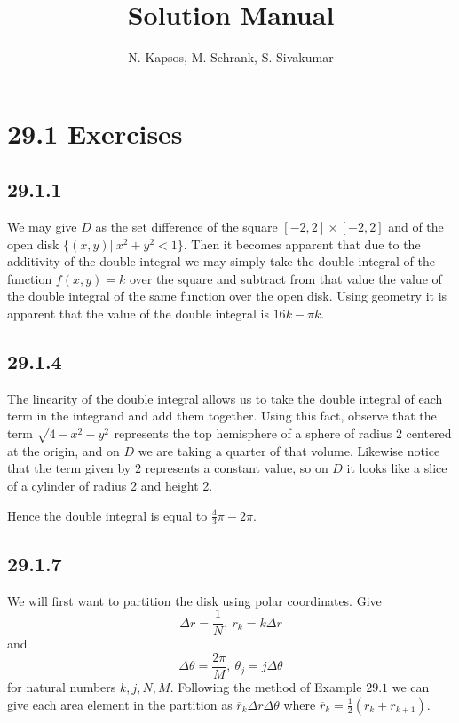 \documentclass{article}
\title{Solution Manual}
\author{N. Kapsos, M. Schrank, S. Sivakumar}
\date{}
\begin{document}
\maketitle
\setcounter{secnumdepth}{0}

\section{29.1 Exercises}

\subsection{29.1.1}

We may give $D$ as the set difference of the square $\left[-2,2\right]\times\left[-2,2\right]$ and of the open disk $\{(x,y)|~x^2+y^2<1\}$. Then it becomes apparent that due to the additivity of the double integral we may simply take the double integral of the function $f(x,y) = k$ over the square and subtract from that value the value of the double integral of the same function over the open disk. Using geometry it is apparent that the value of the double integral is $16k-\pi k$.

\subsection{29.1.4}

The linearity of the double integral allows us to take the double integral of each term in the integrand and add them together. Using this fact, observe that the term $\sqrt{4-x^2-y^2}$ represents the top hemisphere of a sphere of radius 2 centered at the origin, and on $D$ we are taking a quarter of that volume. Likewise notice that the term given by $2$ represents a constant value, so on $D$ it looks like a slice of a cylinder of radius 2 and height 2.

Hence the double integral is equal to $\frac{4}{3}\pi - 2\pi$.

\subsection{29.1.7}

We will first want to partition the disk using polar coordinates. Give $$\Delta r = \frac{1}{N}, ~ r_k = k\Delta r$$ and $$\Delta \theta = \frac{2\pi}{M}, ~ \theta_j = j\Delta \theta$$ for natural numbers $k,j,N,M$. Following the method of Example $\mathbf{29.1}$ we can give each area element in the partition as $\overline{r}_k\Delta r \Delta \theta$ where $\overline{r}_k = \frac{1}{2}(r_k+r_{k+1})$.
\end{document}
